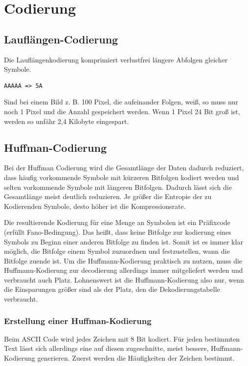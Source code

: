 \section{Codierung}

\subsection{Lauflängen-Codierung}

Die Lauflängenkodierung komprimiert verlustfrei längere Abfolgen gleicher Symbole.

\begin{lstlisting}
AAAAA => 5A
\end{lstlisting}

Sind bei einem Bild z. B. 100 Pixel, die aufeinander Folgen, weiß,
so muss nur noch 1 Pixel und die Anzahl gespeichert werden. Wenn 1 Pixel
24 Bit groß ist, werden so unfähr 2,4 Kilobyte eingespart.

\subsection{Huffman-Codierung}

Bei der Huffman Codierung wird die Gesamtlänge der Daten dadurch reduziert,
dass häufig vorkommende Symbole mit kürzeren Bitfolgen kodiert werden und
selten vorkommende Symbole mit längeren Bitfolgen. Dadurch lässt sich die Gesamtlänge
meist deutlich reduzieren. Je größer die Entropie der zu Kodierenden Symbole, desto
höher ist die Kompressionsrate.

Die resultierende Kodierung für eine Menge an Symbolen ist ein Präfixcode
(erfüllt Fano-Bedingung).
Das heißt, dass keine Bitfolge zur kodierung eines Symbols zu Beginn einer
anderen Bitfolge zu finden ist. Somit ist es immer klar möglich, die Bitfolge
einem Symbol zuzuordnen und festzustellen, wann die Bitfolge zuende ist.
Um die Huffmann-Kodierung praktisch zu nutzen, muss die Huffmann-Kodierung
zur decodierung allerdings immer mitgeliefert werden und verbraucht auch Platz.
Lohnenswert ist die Huffmann-Kodierung also nur, wenn die Einsparungen größer sind als
der Platz, den die Dekodierungstabelle verbraucht. 

\subsubsection{Erstellung einer Huffman-Kodierung}

Beim ASCII Code wird jedes Zeichen mit 8 Bit kodiert.
Für jeden bestimmten Text lässt sich allerdings eine auf diesen
zugeschnitte, meist bessere, Huffmann-Kodierung generieren.
Zuerst werden die Häufigkeiten der Zeichen bestimmt.

